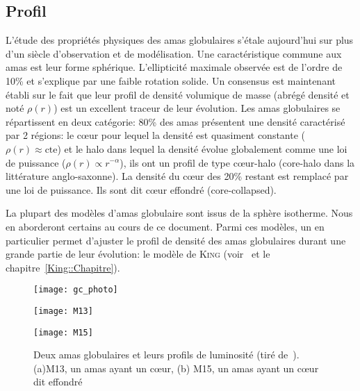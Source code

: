 		\subsection{Profil}

			L'étude des propriétés physiques des amas globulaires s'étale aujourd'hui
			sur plus d'un siècle d'observation et de modélisation. Une caractéristique
			commune aux amas est leur forme sphérique. L'ellipticité maximale observée
			est de l'ordre de 10\% et s'explique par une faible rotation solide. Un
			consensus est maintenant établi sur le fait que leur profil de densité
			volumique de masse (abrégé densité et noté $\rho(r)$) est un excellent
			traceur de leur évolution. Les amas globulaires se répartissent en deux
			catégorie: 80\% des amas présentent une densité caractérisé par 2 régions:
			le cœur pour lequel la densité est quasiment constante ($\rho(r) \approx
			\mathrm{cte}$) et le halo dans lequel la densité évolue globalement comme
			une loi de puissance ($\rho(r) \propto r^{-\alpha}$), ils ont un profil de
			type cœur-halo (core-halo dans la littérature anglo-saxonne). La densité du
			cœur des 20\% restant est remplacé par une loi de puissance. Ils sont dit
			cœur effondré (core-collapsed).

			La plupart des modèles d'amas globulaire sont issus de la sphère isotherme. Nous en
			aborderont certains au cours de ce document. Parmi ces modèles, un en particulier
			permet d'ajuster le profil de densité des amas globulaires durant une grande
			partie de leur évolution: le modèle de \textsc{King}
			(voir~\cite{1966AJ.....71...64K} et le chapitre~\ref{King::Chapitre}).

			\begin{figure}
				\begin{center}
					\texttt{[image: gc\_photo]}
				\end{center}
				\begin{minipage}{0.45\textwidth}
					\begin{center}
						\texttt{[image: M13]}
					\end{center}
				\end{minipage}\hfill
				\begin{minipage}{0.45\textwidth}
					\begin{center}
						\texttt{[image: M15]}
					\end{center}
				\end{minipage}
				\caption{\label{Fig::Intro::images}Deux amas globulaires et leurs profils de luminosité (tiré de~\cite{2010A&A...522A..71J}). (a)M13, un amas ayant un cœur, (b) M15, un amas ayant un cœur dit effondré}
			\end{figure}

